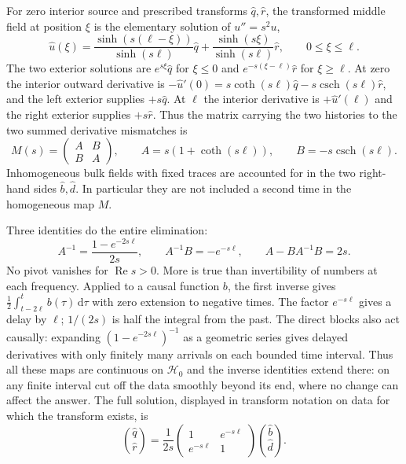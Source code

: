 For zero interior source and prescribed transforms $\widehat q,\widehat r$, the transformed middle field at position $\xi$ is the elementary solution of $u''=s^2u$,
\[
 \widehat u(\xi)=\frac{\sinh(s(\ell-\xi))}{\sinh(s\ell)}\widehat q
              +\frac{\sinh(s\xi)}{\sinh(s\ell)}\widehat r,
 \qquad 0\leq\xi\leq\ell .
\]
The two exterior solutions are $e^{s\xi}\widehat q$ for $\xi\leq0$ and $e^{-s(\xi-\ell)}\widehat r$ for $\xi\geq\ell$. At zero the interior outward derivative is $-\widehat u'(0)=s\coth(s\ell)\widehat q-s\operatorname{csch}(s\ell)\widehat r$, and the left exterior supplies $+s\widehat q$. At $\ell$ the interior derivative is $+\widehat u'(\ell)$ and the right exterior supplies $+s\widehat r$. Thus the matrix carrying the two histories to the two summed derivative mismatches is
\[
 M(s)=\begin{pmatrix}A&B\\ B&A\end{pmatrix},\qquad
 A=s(1+\coth(s\ell)),\qquad B=-s\operatorname{csch}(s\ell).
\]
Inhomogeneous bulk fields with fixed traces are accounted for in the two right-hand sides $\widehat b,\widehat d$. In particular they are not included a second time in the homogeneous map $M$.

Three identities do the entire elimination:
\[
 A^{-1}=\frac{1-e^{-2s\ell}}{2s},\qquad A^{-1}B=-e^{-s\ell},
 \qquad A-BA^{-1}B=2s .
\]
No pivot vanishes for $\operatorname{Re}s>0$. More is true than invertibility of numbers at each frequency. Applied to a causal function $b$, the first inverse gives $\tfrac12\int_{t-2\ell}^t b(\tau)\,\mathrm{d}\tau$ with zero extension to negative times. The factor $e^{-s\ell}$ gives a delay by $\ell$; $1/(2s)$ is half the integral from the past. The direct blocks also act causally: expanding $(1-e^{-2s\ell})^{-1}$ as a geometric series gives delayed derivatives with only finitely many arrivals on each bounded time interval. Thus all these maps are continuous on $\mathcal H_0$ and the inverse identities extend there: on any finite interval cut off the data smoothly beyond its end, where no change can affect the answer. The full solution, displayed in transform notation on data for which the transform exists, is
\begin{equation}
 \binom{\widehat q}{\widehat r}
 =\frac{1}{2s}
  \begin{pmatrix}1&e^{-s\ell}\\ e^{-s\ell}&1\end{pmatrix}
  \binom{\widehat b}{\widehat d} .
 \label{eq:10-two-cuts-line}
\end{equation}

